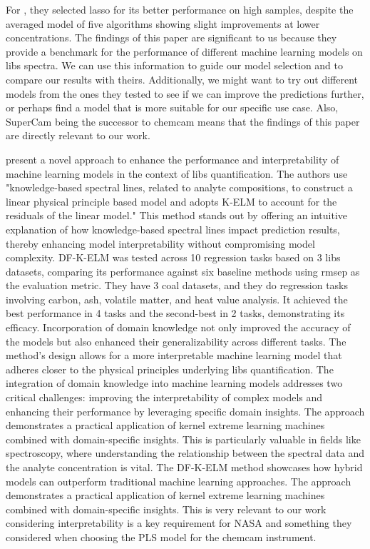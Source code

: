 For , they selected \gls{lasso} for its better performance on high  samples, despite the averaged model of five algorithms showing slight improvements at lower concentrations.
The findings of this paper are significant to us because they provide a benchmark for the performance of different machine learning models on \gls{libs} spectra.
We can use this information to guide our model selection and to compare our results with theirs.
Additionally, we might want to try out different models from the ones they tested to see if we can improve the predictions further, or perhaps find a model that is more suitable for our specific use case.
Also, SuperCam being the successor to \gls{chemcam} means that the findings of this paper are directly relevant to our work.

\citet{song_DF-K-ELM} present a novel approach to enhance the performance and interpretability of machine learning models in the context of \gls{libs} quantification.
The authors use "knowledge-based spectral lines, related to analyte compositions, to construct a linear physical principle based model and adopts K-ELM to account for the residuals of the linear model."
This method stands out by offering an intuitive explanation of how knowledge-based spectral lines impact prediction results, thereby enhancing model interpretability without compromising model complexity.
DF-K-ELM was tested across 10 regression tasks based on 3 \gls{libs} datasets, comparing its performance against six baseline methods using \gls{rmsep} as the evaluation metric.
They have 3 coal datasets, and they do regression tasks involving carbon, ash, volatile matter, and heat value analysis.
It achieved the best performance in 4 tasks and the second-best in 2 tasks, demonstrating its efficacy.
Incorporation of domain knowledge not only improved the accuracy of the models but also enhanced their generalizability across different tasks.
The method's design allows for a more interpretable machine learning model that adheres closer to the physical principles underlying \gls{libs} quantification.
The integration of domain knowledge into machine learning models addresses two critical challenges: improving the interpretability of complex models and enhancing their performance by leveraging specific domain insights.
The approach demonstrates a practical application of kernel extreme learning machines combined with domain-specific insights.
This is particularly valuable in fields like spectroscopy, where understanding the relationship between the spectral data and the analyte concentration is vital.
The DF-K-ELM method showcases how hybrid models can outperform traditional machine learning approaches.
The approach demonstrates a practical application of kernel extreme learning machines combined with domain-specific insights.
This is very relevant to our work considering interpretability is a key requirement for NASA and something they considered when choosing the PLS model for the \gls{chemcam} instrument.

